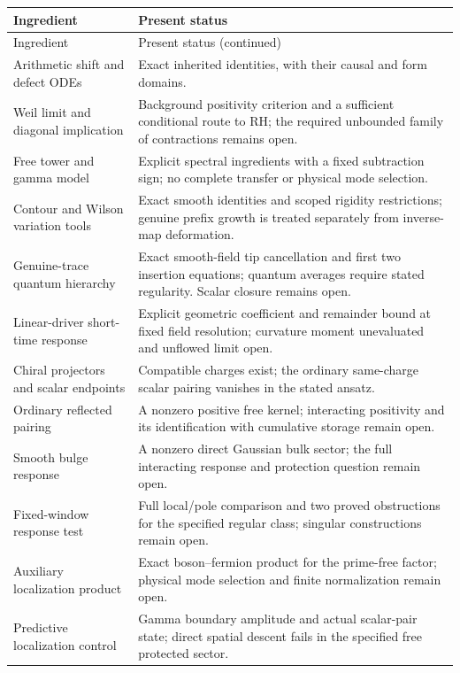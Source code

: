 \begin{longtable}{@{}p{}p{}@{}}
\toprule
Ingredient & Present status\\
\midrule
\endfirsthead
\toprule
Ingredient & Present status (continued)\\
\midrule
\endhead
\bottomrule
\endfoot
Arithmetic shift and defect ODEs &
Exact inherited identities, with their causal and form domains.\\
Weil limit and diagonal implication &
Background positivity criterion and a sufficient conditional route
to RH; the required unbounded family of contractions remains open.\\
Free tower and gamma model &
Explicit spectral ingredients with a fixed subtraction sign;
no complete transfer or physical mode selection.\\
Contour and Wilson variation tools &
Exact smooth identities and scoped rigidity restrictions; genuine
prefix growth is treated separately from inverse-map deformation.\\
Genuine-trace quantum hierarchy &
Exact smooth-field tip cancellation and first two insertion equations;
quantum averages require stated regularity. Scalar closure remains open.\\
Linear-driver short-time response &
Explicit geometric coefficient and remainder bound at fixed field
resolution; curvature moment unevaluated and unflowed limit open.\\
Chiral projectors and scalar endpoints &
Compatible charges exist; the ordinary same-charge scalar
pairing vanishes in the stated ansatz.\\
Ordinary reflected pairing &
A nonzero positive free kernel; interacting positivity and its
identification with cumulative storage remain open.\\
Smooth bulge response &
A nonzero direct Gaussian bulk sector; the full interacting
response and protection question remain open.\\
Fixed-window response test &
Full local/pole comparison and two proved obstructions for the
specified regular class; singular constructions remain open.\\
Auxiliary localization product &
Exact boson--fermion product for the prime-free factor;
physical mode selection and finite normalization remain open.\\
Predictive localization control &
Gamma boundary amplitude and actual scalar-pair state; direct
spatial descent fails in the specified free protected sector.\\

\end{longtable}
